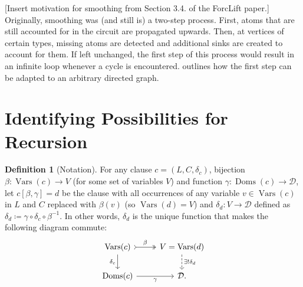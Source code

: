 \documentclass{article}
\theoremstyle{definition}
\newtheorem{definition}{Definition}
\theoremstyle{remark}
\DeclareMathOperator{\Doms}{Doms}
\DeclareMathOperator{\Vars}{Vars}
\begin{document}
[Insert motivation for smoothing from Section 3.4. of the ForcLift paper.] Originally, smoothing was (and still is) a two-step process. First, atoms that are still accounted for in the circuit are propagated upwards. Then, at vertices of certain types, missing atoms are detected and additional sinks are created to account for them. If left unchanged, the first step of this process would result in an infinite loop whenever a cycle is encountered.  outlines how the first step can be adapted to an arbitrary directed graph.

\section{Identifying Possibilities for Recursion}

\begin{definition}[Notation]
  For any clause $c = (L, C, \delta_c)$, bijection $\beta\colon \Vars(c) \to V$ (for some set of variables $V$) and function $\gamma\colon \Doms(c) \to \mathcal{D}$, let $c[\beta, \gamma] = d$ be the clause with all occurrences of any variable $v \in \Vars(c)$ in $L$ and $C$ replaced with $\beta(v)$ (so $\Vars(d) = V$) and $\delta_d\colon V \to \mathcal{D}$ defined as $\delta_d \coloneqq \gamma \circ \delta_c \circ \beta^{-1}$. In other words, $\delta_d$ is the unique function that makes the following diagram commute:
  \[
  \begin{tikzcd}
    \Vars(c) \ar[r, tail, two heads, "\beta"] \arrow[d, swap, "\delta_c"] & V = \Vars(d) \ar[d, dashed, "\exists!\delta_d"] \\
    \Doms(c) \ar[r, swap, "\gamma"] & \mathcal{D}.
  \end{tikzcd}
  \]
\end{definition}
\end{document}
